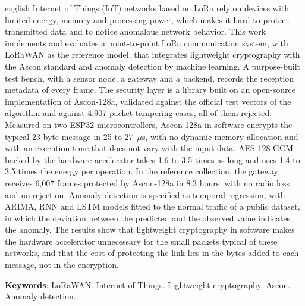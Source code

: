 \documentclass[
	12pt,				%
	openright,			%
	twoside,			%
	a4paper,			%
	english,			%
	brazilian				%
	]{abntex2}
\begin{document}
\begin{resumo}[Abstract]
 \begin{otherlanguage*}{english}
   Internet of Things (IoT) networks based on LoRa rely on devices with limited energy, memory and processing power, which makes it hard to protect transmitted data and to notice anomalous network behavior. This work implements and evaluates a point-to-point LoRa communication system, with LoRaWAN as the reference model, that integrates lightweight cryptography with the Ascon standard and anomaly detection by machine learning. A purpose-built test bench, with a sensor node, a gateway and a backend, records the reception metadata of every frame. The security layer is a library built on an open-source implementation of Ascon-128a, validated against the official test vectors of the algorithm and against 4,907 packet tampering cases, all of them rejected. Measured on two ESP32 microcontrollers, Ascon-128a in software encrypts the typical 23-byte message in 25 to 27~$\mu$s, with no dynamic memory allocation and with an execution time that does not vary with the input data. AES-128-GCM backed by the hardware accelerator takes 1.6 to 3.5 times as long and uses 1.4 to 3.5 times the energy per operation. In the reference collection, the gateway receives 6,007 frames protected by Ascon-128a in 8.3 hours, with no radio loss and no rejection. Anomaly detection is specified as temporal regression, with ARIMA, RNN and LSTM models fitted to the normal traffic of a public dataset, in which the deviation between the predicted and the observed value indicates the anomaly. The results show that lightweight cryptography in software makes the hardware accelerator unnecessary for the small packets typical of these networks, and that the cost of protecting the link lies in the bytes added to each message, not in the encryption.

   \vspace{\onelineskip}
 
   \noindent 
   \textbf{Keywords}: LoRaWAN. Internet of Things. Lightweight cryptography. Ascon. Anomaly detection.
 \end{otherlanguage*}
\end{resumo}
 
\end{document}
